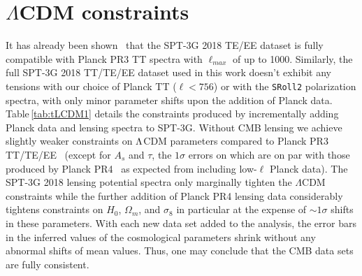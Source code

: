 \documentclass[12pt,a4paper]{article}
\renewcommand\L{\Lambda}
\newcommand\?{/\hspace{0pt}}
\begin{document}
\section{$\Lambda$CDM constraints}
\label{sec:LCDM}
It has already been shown~\cite{Chudaykin:2022rnl} that the SPT-3G 2018 TE/EE dataset is fully compatible with Planck PR3 TT spectra with $\ell_{max}$ of up to 1000. Similarly, the full SPT-3G 2018 TT/TE/EE dataset used in this work doesn't exhibit any tensions with our choice of Planck TT ($\ell<756$) or with the \texttt{SRoll2} polarization spectra, with only minor parameter shifts upon the addition of Planck data. Table\,\ref{tab:tLCDM1} details the constraints produced by incrementally adding Planck data and lensing spectra to SPT-3G. Without CMB lensing we achieve slightly weaker constraints on $\rm \Lambda$CDM parameters compared to Planck PR3 TT/TE/EE~\cite{Planck:2018vyg} (except for $A_s$ and $\tau$, the $1\sigma$ errors on which are on par with those produced by Planck PR4~\cite{Tristram:2023haj} as expected from including low-$\ell$ Planck data).
The SPT-3G 2018 lensing potential spectra only marginally tighten the $\L$CDM constraints while the further addition of Planck PR4 lensing data considerably tightens constraints on $H_0$, $\Omega_m$, and $\sigma_8$ in particular at the expense of $\sim1\sigma$ shifts in these parameters. 
With each new data set added to the analysis, the error bars in the inferred values of the cosmological parameters shrink without any abnormal shifts of mean values. Thus, one may conclude that the CMB data sets are fully consistent. 
\end{document}

